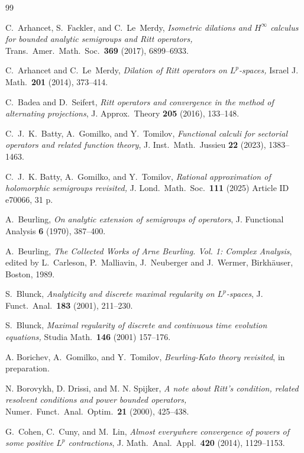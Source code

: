 \documentclass[11pt]{amsart}
\numberwithin{equation}{section}
\theoremstyle{definition}
\theoremstyle{plain}
\begin{document}
\begin{thebibliography}{99}

 C.~Arhancet,  S.~Fackler, and C.~Le~Merdy, 
\emph{Isometric dilations and \(H^{\infty }\) calculus for bounded analytic semigroups and Ritt operators,}  Trans.\ Amer.\ Math.\ Soc.\ \textbf{369} (2017), 6899--6933.

C.~Arhancet and C.~Le~Merdy,
\emph{Dilation of Ritt operators on $L^p$-spaces,} 
Israel J. Math.\ \textbf{201} (2014), 373--414.

C.~Badea and D.~Seifert,
\emph{Ritt operators and convergence in the method of alternating projections},
J. Approx.\ Theory \textbf{205} (2016), 133--148.

C.~J.~K.~Batty, A.~Gomilko, and Y.~Tomilov,
\emph{Functional calculi for sectorial operators and related function theory},
J. Inst.\ Math.\ Jussieu \textbf{22} (2023), 1383--1463.

C.~J.~K. Batty, A.~Gomilko, and Y.~Tomilov,
\emph{Rational approximation of holomorphic semigroups revisited,}
J. Lond.\ Math.\ Soc.\  \textbf{111} (2025) Article ID e70066, 31 p.  

A.~Beurling, \emph{On analytic extension of semigroups of operators},
J. Functional Analysis \textbf{6} (1970), 387--400.

A.~Beurling,
\emph{The Collected Works of Arne Beurling. Vol. 1: Complex Analysis},
edited by L.~Carleson, P.~Malliavin, J.~Neuberger and J.~Wermer,
Birkh\"auser, Boston, 1989.

S.~Blunck, \emph{Analyticity and discrete maximal regularity on $L^p$-spaces},
J. Funct.\ Anal.\ \textbf{183} (2001), 211--230. 

 S.~Blunck, \emph{Maximal regularity of discrete and continuous time evolution equations,}  Studia Math.\ \textbf{146} (2001) 157--176.

 A. Borichev, A.~Gomilko, and Y.~Tomilov,
\emph{Beurling-Kato theory revisited}, in preparation. 

 N. Borovykh, D. Drissi, and M. N.  Spijker, \emph{A note about Ritt’s condition, related resolvent conditions
and power bounded operators,} Numer.\ Funct.\ Anal.\ Optim.\ \textbf{21} (2000), 425--438.

G.~Cohen, C.~Cuny, and  M.~Lin,
\emph{Almost everywhere convergence of powers of some positive $L^p$ contractions},
J. Math.\ Anal.\ Appl.\ \textbf{420} (2014), 1129--1153.


\end{thebibliography}
\end{document}
